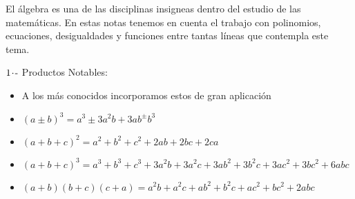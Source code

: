 El álgebra es una de las disciplinas insigneas dentro del estudio de las matemáticas. En estas notas tenemos en cuenta el trabajo con polinomios, ecuaciones, desigualdades y funciones entre tantas líneas que contempla este tema.

\vspace{0.5cm}

$1\hspace{-0.05cm}\cdot\hspace{-0.05cm}\text{-}$ Productos Notables:
\begin{itemize}
    \def\labelitemi{-}
    \addtolength{\itemindent}{0.5cm}
    \item[] A los más conocidos incorporamos estos de gran aplicación
    \item $(a \pm b)^3 = a^3 \pm 3a^2b + 3ab^ \pm b^3$
    \item $(a+b+c)^2 = a^2 + b^2 + c^2 + 2ab + 2bc + 2ca$
    \item $(a+b+c)^3 = a^3 + b^3 + c^3 + 3a^2b + 3a^2c + 3ab^2 + 3b^2c + 3ac^2 + 3bc^2 + 6abc$
    \item $(a+b)(b+c)(c+a) = a^2b +a^2c + ab^2 + b^2c + ac^2 + bc^2 + 2abc$
\end{itemize}

\vspace{0.5cm}

